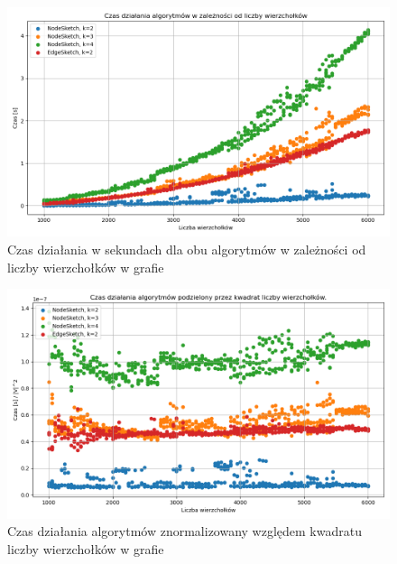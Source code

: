 \begin{figure}[!ht]
    \includegraphics[width=14cm]{img/time_all.png}
    \centering
    \caption[Czas działania algorytmów]{Czas działania w sekundach dla obu algorytmów w zależności od liczby wierzchołków w grafie}
    \label{fig:time_vs_vertices}
\end{figure}

\begin{figure}[!ht]
    \includegraphics[width=14cm]{img/time_normalized.png}
    \centering
    \caption[Znormalizowany czas działania algorytmów]{Czas działania algorytmów znormalizowany względem kwadratu liczby wierzchołków w grafie}
    \label{fig:time_vs_vertices_nomralized}
\end{figure}

